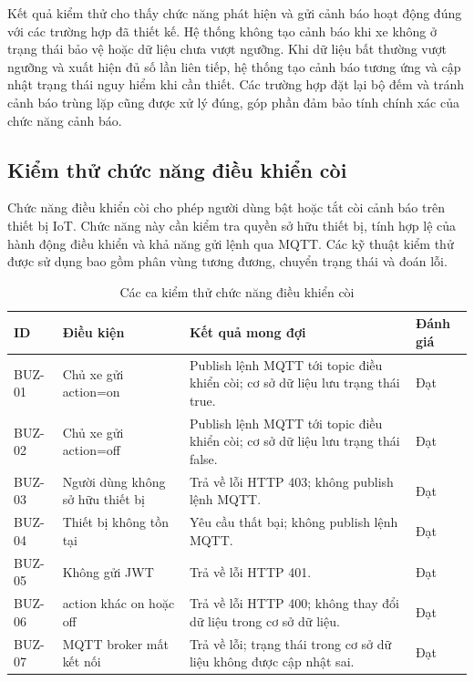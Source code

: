 \documentclass[../DoAn.tex]{subfiles}
\begin{document}
Kết quả kiểm thử cho thấy chức năng phát hiện và gửi cảnh báo hoạt động đúng với các trường hợp đã thiết kế. Hệ thống không tạo cảnh báo khi xe không ở trạng thái bảo vệ hoặc dữ liệu chưa vượt ngưỡng. Khi dữ liệu bất thường vượt ngưỡng và xuất hiện đủ số lần liên tiếp, hệ thống tạo cảnh báo tương ứng và cập nhật trạng thái nguy hiểm khi cần thiết. Các trường hợp đặt lại bộ đếm và tránh cảnh báo trùng lặp cũng được xử lý đúng, góp phần đảm bảo tính chính xác của chức năng cảnh báo.

\subsection{Kiểm thử chức năng điều khiển còi}

Chức năng điều khiển còi cho phép người dùng bật hoặc tắt còi cảnh báo trên thiết bị IoT. Chức năng này cần kiểm tra quyền sở hữu thiết bị, tính hợp lệ của hành động điều khiển và khả năng gửi lệnh qua MQTT. Các kỹ thuật kiểm thử được sử dụng bao gồm phân vùng tương đương, chuyển trạng thái và đoán lỗi.

\begin{table}[H]
\centering
\renewcommand{\arraystretch}{1.3}
\begin{tabular}{|p{}|p{}|p{}|p{}|}
\hline
\textbf{ID} & \textbf{Điều kiện} & \textbf{Kết quả mong đợi} & \textbf{Đánh giá} \\ \hline
BUZ-01 & Chủ xe gửi action=on & Publish lệnh MQTT tới topic điều khiển còi; cơ sở dữ liệu lưu trạng thái true. & Đạt \\ \hline
BUZ-02 & Chủ xe gửi action=off & Publish lệnh MQTT tới topic điều khiển còi; cơ sở dữ liệu lưu trạng thái false. & Đạt \\ \hline
BUZ-03 & Người dùng không sở hữu thiết bị & Trả về lỗi HTTP 403; không publish lệnh MQTT. & Đạt \\ \hline
BUZ-04 & Thiết bị không tồn tại & Yêu cầu thất bại; không publish lệnh MQTT. & Đạt \\ \hline
BUZ-05 & Không gửi JWT & Trả về lỗi HTTP 401. & Đạt \\ \hline
BUZ-06 & action khác on hoặc off & Trả về lỗi HTTP 400; không thay đổi dữ liệu trong cơ sở dữ liệu. & Đạt \\ \hline
BUZ-07 & MQTT broker mất kết nối & Trả về lỗi; trạng thái trong cơ sở dữ liệu không được cập nhật sai. & Đạt \\ \hline
\end{tabular}
\caption{Các ca kiểm thử chức năng điều khiển còi}
\label{tab:test-buzzer}
\end{table}
\end{document}
